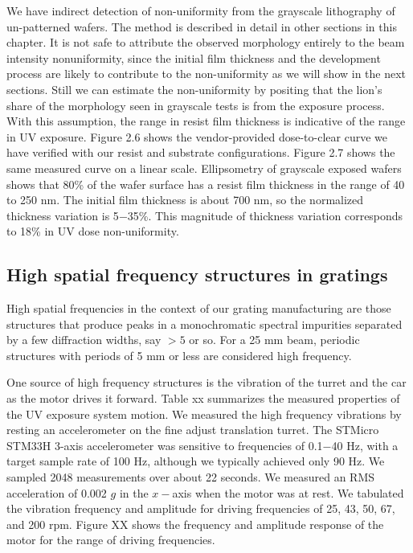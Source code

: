 We have indirect detection of non-uniformity from the grayscale lithography of un-patterned wafers.  The method is described in detail in other sections in this chapter.  It is not safe to attribute the observed morphology entirely to the beam intensity nonuniformity, since the initial film thickness and the development process are likely to contribute to the non-uniformity as we will show in the next sections.  Still we can estimate the non-uniformity by positing that the lion's share of the morphology seen in grayscale tests is from the exposure process.  With this assumption, the range in resist film thickness is indicative of the range in UV exposure.  Figure 2.6 shows the vendor-provided dose-to-clear curve we have verified with our resist and substrate configurations.  Figure 2.7 shows the same measured curve on a linear scale.  Ellipsometry of grayscale exposed wafers shows that 80\% of the wafer surface has a resist film thickness in the range of 40 to 250 nm.  The initial film thickness is about 700 nm, so the normalized thickness variation is 5$-$35\%.  This magnitude of thickness variation corresponds to 18\% in UV dose non-uniformity.


\subsection{High spatial frequency structures in gratings}
High spatial frequencies in the context of our grating manufacturing are those structures that produce peaks in a monochromatic spectral impurities separated by a few diffraction widths, say $>5$ or so.  For a 25 mm beam, periodic structures with periods of 5 mm or less are considered high frequency.

One source of high frequency structures is the vibration of the turret and the car as the motor drives it forward.  Table xx summarizes the measured properties of the UV exposure system motion.  We measured the high frequency vibrations by resting an accelerometer on the fine adjust translation turret.  The STMicro STM33H 3-axis accelerometer was sensitive to frequencies of 0.1$-$40 Hz, with a target sample rate of 100 Hz, although we typically achieved only 90 Hz.  We sampled 2048 measurements over about 22 seconds.  We measured an RMS acceleration of 0.002 $g$ in the $x-$axis when the motor was at rest.  We tabulated the vibration frequency and amplitude for driving frequencies of 25, 43, 50, 67, and 200 rpm.  Figure XX shows the frequency and amplitude response of the motor for the range of driving frequencies.  

